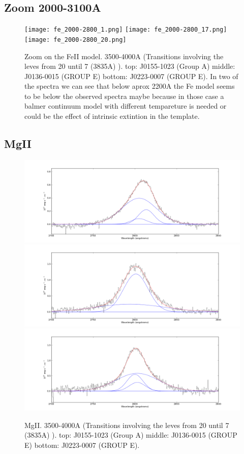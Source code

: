\documentclass[usenatbib]{mn2e}
\begin{document}
\newpage


\subsection{Zoom 2000-3100A}

\begin{figure}
\begin{center}
\texttt{[image: fe\_2000-2800\_1.png]}
\vspace{5mm}
\texttt{[image: fe\_2000-2800\_17.png]}\\
\texttt{[image: fe\_2000-2800\_20.png]}
\end{center} 
\caption{Zoom on the FeII model. 3500-4000A (Transitions involving  the leves from 20 until 7 (3835A) ).   top: J0155-1023 (Group A) middle: J0136-0015 (GROUP E) bottom: J0223-0007 (GROUP E). In two of the spectra  we can see that below aprox 2200A the Fe model seems to be below the observed spectra maybe  because in those case a balmer continuum model with different tempareture is needed or could be the effect of   intrinsic extintion in the template. \label{fig:landscape}}   
\end{figure}

\newpage

\subsection{MgII}

\begin{figure}
\begin{center}
\includegraphics[width=0.46\linewidth,angle=0]{MgII_1.png}
\vspace{5mm}
\includegraphics[width=0.49\linewidth,angle=0]{MgII_17.png}\\
\includegraphics[width=0.46\linewidth,angle=0]{MgII_20.png}
\end{center} 
\caption{MgII. 3500-4000A (Transitions involving  the leves from 20 until 7 (3835A) ).   top: J0155-1023 (Group A) middle: J0136-0015 (GROUP E) bottom: J0223-0007 (GROUP E). \label{fig:landscape}}   
\end{figure}
\end{document}

